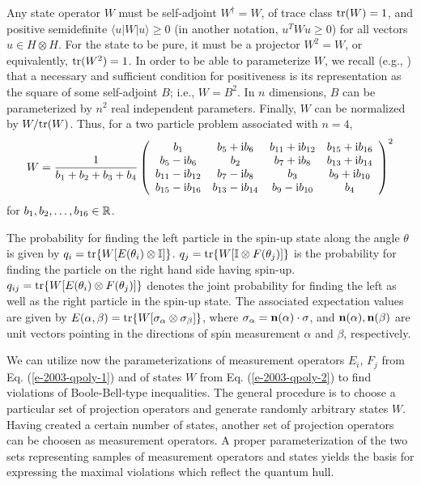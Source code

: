 Any state operator $W$ must be self-adjoint $W^\dagger =W$,
of trace class ${\rm tr} (W)=1$, and  positive semidefinite
$\langle u | W | u \rangle \ge 0$ (in another
notation, $u^TWu\ge 0$) for all vectors $u\in H\otimes H$.
For the state to be pure, it must be a projector $W^2=W$,
or equivalently, ${\rm tr}(W^2)=1$.
In order to be able to parameterize $W$,
we recall (e.g., \cite[Sect. 72]{halmos-vs})
that a necessary and sufficient condition for
positiveness is its representation as the square of
some self-adjoint $B$; i.e., $W=B^2$.
In $n$ dimensions, $B$ can be parameterized by $n^2$
real independent parameters. Finally, $W$ can be normalized
by $W/ {\rm tr}(W)$.
Thus, for a two particle problem associated with $n=4$,
\begin{equation}
    \label{e-2003-qpoly-2}
    W={1 \over b_1+b_2+b_3+b_4}\left(\begin{array}{cccc}
        b_1 & b_5 + {\rm i}b_6 & b_{11} + {\rm i}b_{12} & b_{15} + {\rm i}b_{16}\\
        b_5 - {\rm i}b_6 & b_2 & b_7 + {\rm i}b_8 & b_{13} + {\rm i}b_{14}\\
        b_{11} - {\rm i}b_{12} & b_7 - {\rm i}b_8 & b_3 & b_9 + {\rm i}b_{10}\\
        b_{15} - {\rm i}b_{16} & b_{13} - {\rm i}b_{14} & b_9 - {\rm i}b_{10} &b_4
      \end{array}\right)^2
\end{equation}
for $b_1,b_2,\ldots ,b_{16}\in {\Bbb R}$.

The probability for finding the left particle in the spin-up state
along the angle $\theta$ is given  by
$q_i = {\rm tr}\{{W} [{E}(\theta_i) \otimes {\Bbb I}]\}$.
$q_j = {\rm tr}\{{W} [{\Bbb I} \otimes {F}(\theta_j)]\}$ is
the probability for finding the particle on the right hand side having
spin-up.
$q_{ij} = {\rm tr}\{{W} [{E}(\theta_i) \otimes {F}(\theta_j)]\}$ denotes the joint probability
for finding the left as well as the right particle in the spin-up state.
The associated expectation values are given by
$E(\alpha,\beta)={\rm tr}\{{W} [{\bf \sigma}_\alpha  \otimes
{\bf \sigma}_\beta ]\}$,
where $\sigma_\alpha= {\bf n}(\alpha )\cdot {\bf \sigma}$,
and ${\bf n}(\alpha ),{\bf n}(\beta )$
are unit vectors pointing in the directions
of spin measurement $\alpha$ and $\beta$, respectively.

We can utilize now the parameterizations of measurement operators
$E_i,\,F_j$ from Eq. (\ref{e-2003-qpoly-1})
and of states $W$ from Eq. (\ref{e-2003-qpoly-2})
to find violations of Boole-Bell-type
inequalities.
The general procedure is to choose a particular set of
projection operators and generate randomly arbitrary states $W$.
Having created a certain number of states, another set of
projection operators can be choosen as measurement operators.
A proper parameterization of the two sets representing samples of
measurement operators and states yields the basis
for expressing the maximal violations which reflect the quantum hull.


